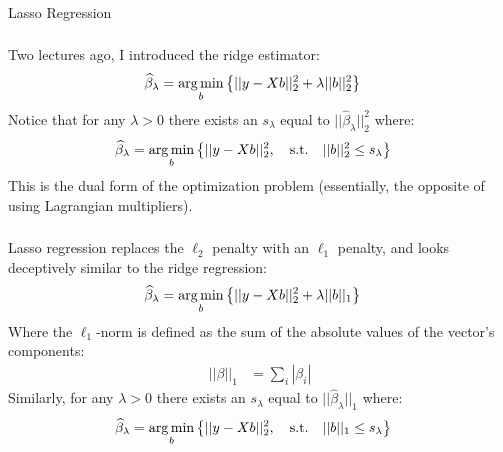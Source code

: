 \begin{frame}[fragile] \frametitle{}

{\color{yaleblue}\fontsize{16pt}{20pt}\selectfont Lasso Regression }

\end{frame}

\begin{frame}[fragile] \frametitle{}

Two lectures ago, I introduced the ridge estimator:
\begin{align*}
\widehat{\beta}_\lambda &= \mathop{\mathrm{arg\,min}}_b \left\{ || y - Xb ||_2^2 + \lambda ||b||_2^2 \right\}
\end{align*}
\pause Notice that for any $\lambda > 0$ there exists an $s_\lambda$ equal
to $||\widehat{\beta}_\lambda||_2^2$ where:
\begin{align*}
\widehat{\beta}_\lambda &= \mathop{\mathrm{arg\,min}}_b \left\{ || y - Xb ||_2^2, \quad \text{s.t.} \quad || b ||_2^2 \leq s_\lambda \right\}
\end{align*}
\pause This is the dual form of the optimization problem (essentially, the
opposite of using Lagrangian multipliers).

\end{frame}

\begin{frame}[fragile] \frametitle{}

Lasso regression replaces the $\ell_2$ penalty with an $\ell_1$ penalty,
and looks deceptively similar to the ridge regression:
\begin{align*}
\widehat{\beta}_\lambda &= \mathop{\mathrm{arg\,min}}_b \left\{ || y - Xb ||_2^2 + \lambda ||b||_1 \right\}
\end{align*}
Where the $\ell_1$-norm is defined as the sum of the absolute values of the
vector's components:
\begin{align*}
|| \beta ||_1 &= \sum_i | \beta_i |
\end{align*}
\pause Similarly, for any $\lambda > 0$ there exists an $s_\lambda$ equal
to $||\widehat{\beta}_\lambda||_1$ where:
\begin{align*}
\widehat{\beta}_\lambda &= \mathop{\mathrm{arg\,min}}_b \left\{ || y - Xb ||_2^2, \quad \text{s.t.} \quad || b ||_1 \leq s_\lambda \right\}
\end{align*}

\end{frame}

